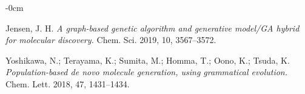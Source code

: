 \documentclass[life,article,submit,pdftex,moreauthors]{Definitions/mdpi}
\begin{document}
\begin{adjustwidth}{-\extralength}{0cm}
{\begin{thebibliography}{999}
Jensen, J. H.
\textit{A graph-based genetic algorithm and generative model/GA hybrid for molecular discovery.}
Chem. Sci. 2019, 10, 3567--3572.

Yoshikawa, N.; Terayama, K.; Sumita, M.; Homma, T.; Oono, K.; Tsuda, K.
\textit{Population-based de novo molecule generation, using grammatical evolution.}
Chem. Lett. 2018, 47, 1431--1434.


\end{thebibliography}
}



%


\PublishersNote{}
\end{adjustwidth}
\end{document}
